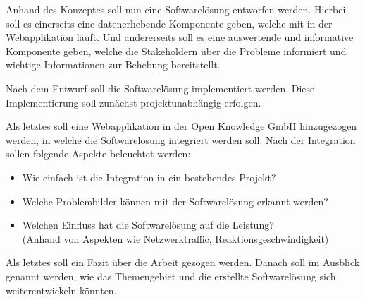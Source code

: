 Anhand des Konzeptes soll nun eine Softwarelösung entworfen werden. Hierbei soll es einerseits eine datenerhebende Komponente geben, welche mit in der Webapplikation läuft. Und andererseits soll es eine auswertende und informative Komponente geben, welche die Stakeholdern über die Probleme informiert und wichtige Informationen zur Behebung bereitstellt.

Nach dem Entwurf soll die Softwarelösung implementiert werden. Diese Implementierung soll zunächst projektunabhängig erfolgen.

Als letztes soll eine Webapplikation in der Open Knowledge GmbH hinzugezogen werden, in welche die Softwarelösung integriert werden soll. Nach der Integration sollen folgende Aspekte beleuchtet werden:

\begin{itemize}
	\item Wie einfach ist die Integration in ein bestehendes Projekt?
	\item Welche Problembilder können mit der Softwarelösung erkannt werden?
	\item Welchen Einfluss hat die Softwarelösung auf die Leistung? \\(Anhand von Aspekten wie Netzwerktraffic, Reaktionsgeschwindigkeit)
\end{itemize}

Als letztes soll ein Fazit über die Arbeit gezogen werden. Danach soll im Ausblick genannt werden, wie das Themengebiet und die erstellte Softwarelösung sich weiterentwickeln könnten.

